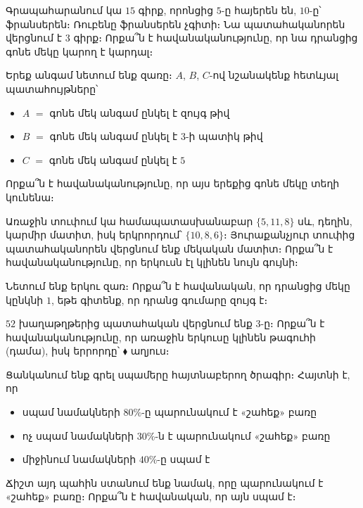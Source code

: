 \begin{problem}
Գրապահարանում կա $15$ գիրք, որոնցից $5$-ը հայերեն են, $10$-ը՝ ֆրանսերեն։ Ռուբենը ֆրանսերեն չգիտի։ Նա պատահականորեն վերցնում է $3$ գիրք։ Որքա՞ն է հավանականությունը, որ նա դրանցից գոնե մեկը կարող է կարդալ։
\end{problem}

\begin{problem}
Երեք անգամ նետում ենք զառը։ $A$, $B$, $C$-ով նշանակենք հետևյալ պատահույթները՝
\begin{itemize}
    \item $A$ $=$ գոնե մեկ անգամ ընկել է զույգ թիվ
    \item $B$ $=$ գոնե մեկ անգամ ընկել է $3$-ի պատիկ թիվ
    \item $C$ $=$ գոնե մեկ անգամ ընկել է $5$
\end{itemize}
Որքա՞ն է հավանականությունը, որ այս երեքից գոնե մեկը տեղի կունենա։
\end{problem}

\begin{problem}
Առաջին տուփում կա համապատասխանաբար $\{5, 11, 8\}$ սև, դեղին, կարմիր մատիտ, իսկ երկրորդում՝ $\{10, 8, 6\}$։ Յուրաքանչյուր տուփից պատահականորեն վերցնում ենք մեկական մատիտ։ Որքա՞ն է հավանականությունը, որ երկուսն էլ կլինեն նույն գույնի։
\end{problem}

\begin{problem}
Նետում ենք երկու զառ։ Որքա՞ն է հավանական, որ դրանցից մեկը կընկնի $1$, եթե գիտենք, որ դրանց գումարը զույգ է։
\end{problem}

\begin{problem}
$52$ խաղաթղթերից  պատահական վերցնում ենք $3$-ը։ Որքա՞ն է հավանականությունը, որ առաջին երկուսը կլինեն թագուհի (դամա), իսկ երրորդը՝ {\color{myred}$\blacklozenge$} աղյուս։
\end{problem}

\begin{problem}
Ցանկանում ենք գրել սպամերը հայտնաբերող ծրագիր։
Հայտնի է, որ
\begin{itemize}
    \item սպամ նամակների $80\%$-ը պարունակում է «շահեք» բառը
    \item ոչ սպամ նամակների $30\%$-ն է պարունակում «շահեք» բառը
    \item միջինում նամակների $40\%$-ը սպամ է
\end{itemize}
Ճիշտ այդ պահին ստանում ենք նամակ, որը պարունակում է «շահեք» բառը։ Որքա՞ն է հավանական, որ այն սպամ է։
\end{problem}

